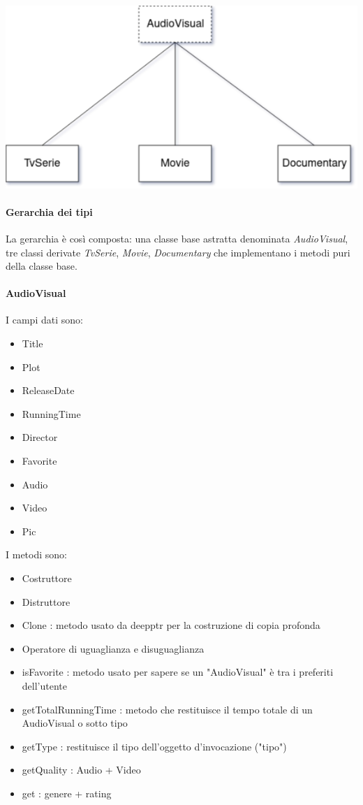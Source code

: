 \includegraphics[width=1\textwidth]{gerarchia}
\paragraph{Gerarchia dei tipi}
La gerarchia è così composta: una classe base astratta denominata \textit{AudioVisual}, tre classi derivate \textit{TvSerie}, \textit{Movie}, \textit{Documentary} che implementano i metodi puri della classe base. \newline

\paragraph{AudioVisual}
I campi dati sono:
\begin{itemize}
    \item Title
    \item Plot
    \item ReleaseDate
    \item RunningTime
    \item Director
    \item Favorite
    \item Audio
    \item Video
    \item Pic %
\end{itemize}
I metodi sono:
\begin{itemize}
    \item Costruttore
    \item Distruttore
    \item Clone : metodo usato da deepptr per la costruzione di copia profonda
    \item Operatore di uguaglianza e disuguaglianza
    \item isFavorite : metodo usato per sapere se un "AudioVisual" è tra i preferiti dell'utente
    \item getTotalRunningTime : metodo che restituisce il tempo totale di un AudioVisual o sotto tipo
    \item getType : restituisce il tipo dell'oggetto d'invocazione ("tipo")
    \item getQuality : Audio + Video
    \item get : genere + rating 
\end{itemize}

